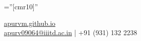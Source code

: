 \documentclass[a4paper,11pt]{article} %
\begin{document}
\pagestyle{empty} %

\font\fb=''[cmr10]'' %

\par{\par} %
\center {}\href{https://apurvm.github.io}{apurvm.github.io}\\
\href{mailto:apurv09064@iiitd.ac.in}{apurv09064@iiitd.ac.in} | +91 (931) 132 2238 %

\end{document}
